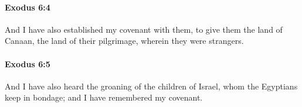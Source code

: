 		\paragraph{Exodus 6:4} %
			\label{EXODUS-6-4}

			And I have also established my covenant with them, to give them the land of Canaan, the land of their pilgrimage, wherein they were strangers.


		\paragraph{Exodus 6:5} %
			\label{EXODUS-6-5}

			And I have also heard the groaning of the children of Israel, whom the Egyptians keep in bondage; and I have remembered my covenant.



